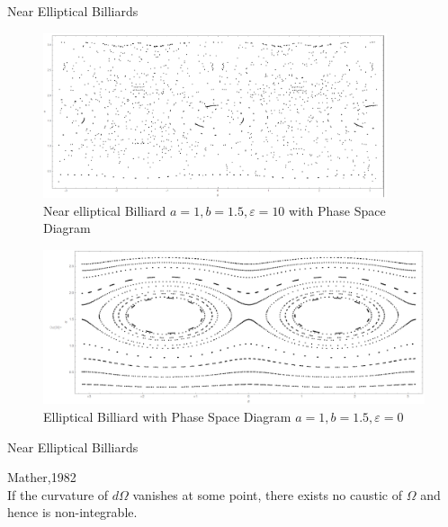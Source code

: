 \documentclass{beamer}
\begin{document}
\begin{frame}{Near Elliptical Billiards}
  \begin{figure}
    \centering
    \includegraphics[width = 0.9\textwidth]{NearellipsePhaseSpace5}
    \caption{Near elliptical Billiard $a=1, b=1.5, \varepsilon = 10$ with Phase Space Diagram}
  \end{figure}
\end{frame}

\begin{frame}
  \begin{figure}
    \centering
    \includegraphics[width = 1\textwidth]{EllipsePhaseSpace2}
    \caption{Elliptical Billiard with Phase Space Diagram $a = 1, b = 1.5, \varepsilon = 0$}
  \end{figure}
\end{frame}

\begin{frame}{Near Elliptical Billiards}
    \begin{theorem}Mather,1982\\
     If the curvature of $d\Omega$ vanishes at some point, there exists no caustic of $\Omega$ and hence is non-integrable.
    \end{theorem}
\end{frame}

\end{document}
